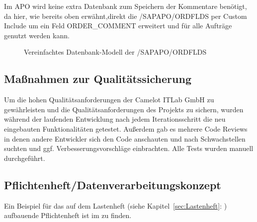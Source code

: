 Im \ac{APO} wird keine extra Datenbank zum Speichern der Kommentare benötigt, da hier, wie bereits oben erwähnt,direkt die /SAPAPO/ORDFLDS per Custom Include um ein Feld ORDER\_COMMENT erweitert und für alle Aufträge genutzt werden kann.  

\begin{figure}[htb]
	\centering
	\caption{Vereinfachtes Datenbank-Modell der /SAPAPO/ORDFLDS}
	\label{fig:APO01}
\end{figure} 

\subsection{Maßnahmen zur Qualitätssicherung}
\label{sec:Qualitaetssicherung}
Um die hohen Qualitätsanforderungen der Camelot ITLab GmbH zu gewährleisten und die Qualitätsanforderungen des Projekts zu sichern, wurden während der laufenden Entwicklung nach jedem Iterationsschritt die neu eingebauten Funktionalitäten getestet. Außerdem gab es mehrere Code Reviews in denen andere Entwickler sich den Code anschauten und nach Schwachstellen suchten und ggf. Verbesserungsvorschläge einbrachten. Alle Tests wurden manuell durchgeführt.  

\subsection{Pflichtenheft/Datenverarbeitungskonzept}
\label{sec:Pflichtenheft}
Ein Beispiel für das auf dem Lastenheft (siehe Kapitel~\ref{sec:Lastenheft}: ) aufbauende Pflichtenheft ist im  zu finden.

